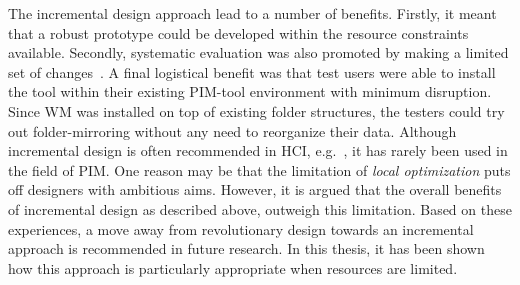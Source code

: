 
The incremental design approach lead to a number of benefits.  Firstly, it meant that a robust prototype could be developed within the resource constraints available.  Secondly, systematic evaluation was also promoted by making a limited set of changes~\citep{newman:95}.  A final logistical benefit was that test users were able to install the tool within their existing PIM-tool environment with minimum disruption.  Since WM was installed on top of existing folder structures, the testers could try out folder-mirroring without any need to reorganize their data.  Although incremental design is often recommended in HCI, e.g.~\citep{Carroll:00}, it has rarely been used in the field of PIM.  One reason may be that the limitation of \textit{local optimization} puts off designers with ambitious aims.  However, it is argued that the overall benefits of incremental design as described above, outweigh this limitation.
Based on these experiences, a move away from revolutionary design towards an incremental approach is recommended in future research.  In this thesis, it has been shown how this approach is particularly appropriate when resources are limited. %

